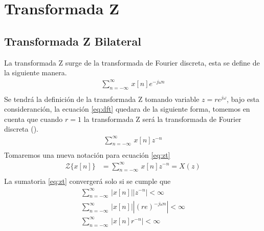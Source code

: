\documentclass[12pt]{article}
\begin{document}

\newpage
\section{Transformada Z}
\subsection{Transformada Z Bilateral}
La transformada Z surge de la transformada de Fourier discreta, esta se define de la siguiente manera.
\begin{equation}
    \begin{split}
        \displaystyle\sum_{n=-\infty}^\infty\,x[n]e^{-j\omega n}\\
    \end{split}
    \label{eq:dft}
\end{equation}
Se tendrá la definición de la transformada Z tomando variable $z=re^{j\omega}$, bajo esta consideranción, la ecuación \ref{eq:dft} quedara de la siguiente forma, tomemos en cuenta que cuando $r=1$ la transformada Z será la transformada de Fourier discreta (\cite{schafer1989discrete}).
\begin{equation}
    \begin{split}
        \displaystyle\sum_{n=-\infty}^\infty\,x[n]z^{-n}\\
    \end{split}
    \label{eq:zt}
\end{equation}
Tomaremos una nueva notación para ecuación \ref{eq:zt} 
\begin{equation}
    \begin{split}
        \mathscr{Z}\{x[n]\}&=\displaystyle\sum_{n=-\infty}^\infty\,x[n]z^{-n}=X(z)\\
    \end{split}
    \label{eq:zt1}
\end{equation}
La sumatoria \ref{eq:zt} convergerá solo si se cumple que
\begin{equation}
    \begin{split}
        \displaystyle\sum_{n=-\infty}^\infty\,|x[n]||z^{-n}|<\infty\\
        \displaystyle\sum_{n=-\infty}^\infty\,|x[n]||(re)^{-j\omega n}|<\infty\\
        \displaystyle\sum_{n=-\infty}^\infty\,|x[n]r^{-n}|<\infty\\
    \end{split}
    \label{eq:zt2}
\end{equation}
\end{document}
